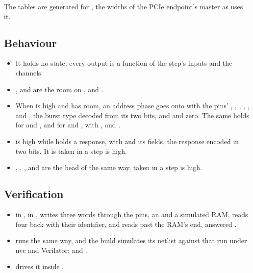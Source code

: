 The tables are generated for , the widths of
the PCIe endpoint's master as  uses it.


\subsection*{Behaviour}

\begin{itemize}
\item It holds no state; every output is a function of the step's
inputs and the channels.
\item {},  and  are the room on
,  and .
\item When  is high and  has room, an address
phase goes onto  with the pins' , ,
, , ,  and , the
burst type decoded from its two bits, and  and 
zero. The same holds for  and , and for
 and , with ,  and
.
\item {} is high while  holds a response, with
 and  its fields, the response encoded in two
bits. It is taken in a step  is high.
\item {}, , ,  and
 are the head of  the same way, taken in a step
 is high.
\end{itemize}

\subsection*{Verification}

\begin{itemize}
\item {}
in , in , writes three
words through the pins, an  and a simulated RAM, reads four
back with their identifier, and reads past the RAM's end, answered
.
\item {} runs  the same
way, and the build simulates its netlist against that run under nvc and
Verilator:  and
.
\item {} drives it inside .
\end{itemize}

